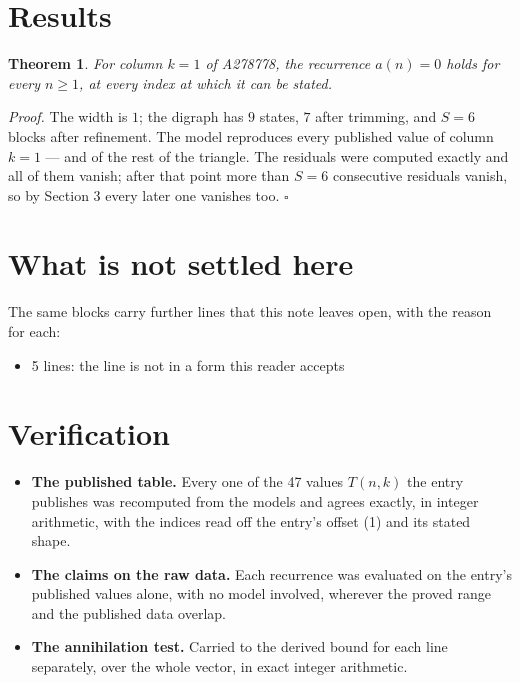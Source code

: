 \documentclass[11pt]{article}
\newtheorem{theorem}{Theorem}
\theoremstyle{definition}
\begin{document}
\section{Results}

\begin{theorem} For column $k = 1$ of A278778, the recurrence $a(n) = 0$ holds for every $n \ge 1$, at every index at which it can be stated.\end{theorem}

{\itshape Proof.} The width is $1$; the digraph has $9$ states, $7$ after trimming, and $S = 6$ blocks after refinement. The model reproduces every published value of column $k = 1$ --- and of the rest of the triangle. The residuals were computed exactly and all of them vanish; after that point more than $S = 6$ consecutive residuals vanish, so by Section 3 every later one vanishes too. $\square$

\section{What is not settled here}

The same blocks carry further lines that this note leaves open, with the reason for each:

\begin{itemize}

\item 5 lines: the line is not in a form this reader accepts

\end{itemize}

\section{Verification}

\begin{itemize}

\item {\bfseries The published table.} Every one of the 47 values $T(n,k)$ the entry publishes was recomputed from the models and agrees exactly, in integer arithmetic, with the indices read off the entry's offset (1) and its stated shape.

\item {\bfseries The claims on the raw data.} Each recurrence was evaluated on the entry's published values alone, with no model involved, wherever the proved range and the published data overlap.

\item {\bfseries The annihilation test.} Carried to the derived bound for each line separately, over the whole vector, in exact integer arithmetic.

\end{itemize}
\end{document}
